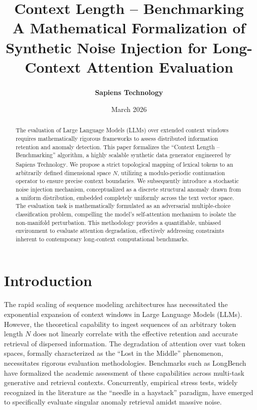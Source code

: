 \documentclass[11pt,a4paper]{article}
\title{\Huge \textbf{Context Length -- Benchmarking}\\ \Large A Mathematical Formalization of Synthetic Noise Injection for Long-Context Attention Evaluation}
\author{\Large \textbf{Sapiens Technology\textsuperscript{\tiny\textregistered}}}
\date{March 2026}
\begin{document}
\maketitle

\begin{abstract}
The evaluation of Large Language Models (LLMs) over extended context windows requires mathematically rigorous frameworks to assess distributed information retention and anomaly detection. This paper formalizes the ``Context Length -- Benchmarking'' algorithm, a highly scalable synthetic data generator engineered by Sapiens Technology\textsuperscript{\tiny\textregistered}. We propose a strict topological mapping of lexical tokens to an arbitrarily defined dimensional space $N$, utilizing a modulo-periodic continuation operator to ensure precise context boundaries. We subsequently introduce a stochastic noise injection mechanism, conceptualized as a discrete structural anomaly drawn from a uniform distribution, embedded completely uniformly across the text vector space. The evaluation task is mathematically formulated as an adversarial multiple-choice classification problem, compelling the model's self-attention mechanism to isolate the non-manifold perturbation. This methodology provides a quantifiable, unbiased environment to evaluate attention degradation, effectively addressing constraints inherent to contemporary long-context computational benchmarks.
\end{abstract}

\newpage
\tableofcontents
\newpage

\section{Introduction}
The rapid scaling of sequence modeling architectures has necessitated the exponential expansion of context windows in Large Language Models (LLMs). However, the theoretical capability to ingest sequences of an arbitrary token length $N$ does not linearly correlate with the effective retention and accurate retrieval of dispersed information. The degradation of attention over vast token spaces, formally characterized as the ``Lost in the Middle'' phenomenon, necessitates rigorous evaluation methodologies. Benchmarks such as LongBench have formalized the academic assessment of these capabilities across multi-task generative and retrieval contexts. Concurrently, empirical stress tests, widely recognized in the literature as the ``needle in a haystack'' paradigm, have emerged to specifically evaluate singular anomaly retrieval amidst massive noise.
\end{document}
